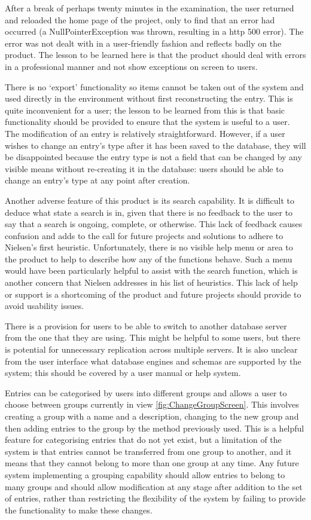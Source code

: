 After a break of perhaps twenty minutes in the examination, the user returned and reloaded the home page of the project, only to find that an error had occurred (a NullPointerException was thrown, resulting in a \gls{http} 500 error).  The error was not dealt with in a user-friendly fashion and reflects badly on the product.  The lesson to be learned here is that the product should deal with errors in a professional manner and not show exceptions on screen to users.

There is no `export' functionality so items cannot be taken out of the system and used directly in the \bibtex{} environment without first reconstructing the entry.  This is quite inconvenient for a user; the lesson to be learned from this is that basic functionality should be provided to ensure that the system is useful to a user.
The modification of an entry is relatively straightforward.  However, if a user wishes to change an entry's type after it has been saved to the database, they will be disappointed because the entry type is not a field that can be changed by any visible means without re-creating it in the database: users should be able to change an entry's type at any point after creation.

Another adverse feature of this product is its search capability.  It is difficult to deduce what state a search is in, given that there is no feedback to the user to say that a search is ongoing, complete, or otherwise.  This lack of feedback causes confusion and adds to the call for future projects and solutions to adhere to Nielsen's first heuristic. Unfortunately, there is no visible help menu or area to the product to help to describe how any of the functions behave. Such a menu would have been particularly helpful to assist with the search function, which is another concern that Nielsen addresses in his list of heuristics.  This lack of help or support is a shortcoming of the product and future projects should provide to avoid usability issues.

There is a provision for users to be able to switch to another database server from the one that they are using.  This might be helpful to some users, but there is potential for unnecessary replication across multiple servers.  It is also unclear from the user interface what database engines and schemas are supported by the system; this should be covered by a user manual or help system.

Entries can be categorised by users into different groups and allows a user to choose between groups currently in view \ref{fig:ChangeGroupScreen}.  This involves creating a group with a name and a description, changing to the new group and then adding entries to the group by the method previously used.  This is a helpful feature for categorising entries that do not yet exist, but a limitation of the system is that entries cannot be transferred from one group to another, and it means that they cannot belong to more than one group at any time.  Any future system implementing a grouping capability should allow entries to belong to many groups and should allow modification at any stage after addition to the set of entries, rather than restricting the flexibility of the system by failing to provide the functionality to make these changes.

